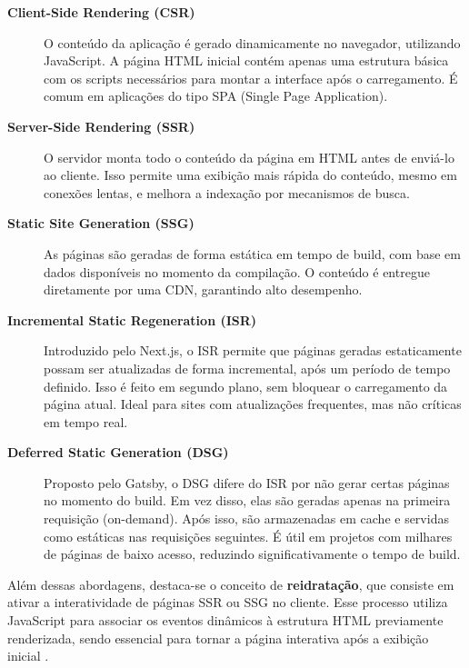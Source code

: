 \begin{description}
  \item[\textbf{Client-Side Rendering (CSR)}] 
  O conteúdo da aplicação é gerado dinamicamente no navegador, utilizando JavaScript. A página HTML inicial contém apenas uma estrutura básica com os scripts necessários para montar a interface após o carregamento. É comum em aplicações do tipo SPA (Single Page Application).
  
  \item[\textbf{Server-Side Rendering (SSR)}]
  O servidor monta todo o conteúdo da página em HTML antes de enviá-lo ao cliente. Isso permite uma exibição mais rápida do conteúdo, mesmo em conexões lentas, e melhora a indexação por mecanismos de busca.

  \item[\textbf{Static Site Generation (SSG)}]
  As páginas são geradas de forma estática em tempo de build, com base em dados disponíveis no momento da compilação. O conteúdo é entregue diretamente por uma CDN, garantindo alto desempenho.

  \item[\textbf{Incremental Static Regeneration (ISR)}]
  Introduzido pelo Next.js, o ISR permite que páginas geradas estaticamente possam ser atualizadas de forma incremental, após um período de tempo definido. Isso é feito em segundo plano, sem bloquear o carregamento da página atual. Ideal para sites com atualizações frequentes, mas não críticas em tempo real.

  \item[\textbf{Deferred Static Generation (DSG)}]
  Proposto pelo Gatsby, o DSG difere do ISR por não gerar certas páginas no momento do build. Em vez disso, elas são geradas apenas na primeira requisição (on-demand). Após isso, são armazenadas em cache e servidas como estáticas nas requisições seguintes. É útil em projetos com milhares de páginas de baixo acesso, reduzindo significativamente o tempo de build.
\end{description}

Além dessas abordagens, destaca-se o conceito de \textbf{reidratação}, que consiste em ativar a interatividade de páginas SSR ou SSG no cliente. Esse processo utiliza JavaScript para associar os eventos dinâmicos à estrutura HTML previamente renderizada, sendo essencial para tornar a página interativa após a exibição inicial \cite{osmani2025}.



